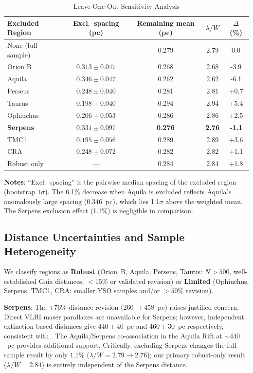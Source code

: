 \documentclass[twoside,twocolumn]{mnras}
\begin{document}
\begin{table}[h]
\caption{Leave-One-Out Sensitivity Analysis}
\label{tab:leave_one_out}
\begin{tabular}{lcccc}
\toprule
Excluded Region & Excl.\ spacing (pc) & Remaining mean (pc) & $\lambda/W$ & $\Delta$ (\%) \\
\midrule
None (full sample) & --- & 0.279 & 2.79 & 0.0 \\
Orion B & $0.313 \pm 0.047$ & 0.268 & 2.68 & -3.9 \\
Aquila & $0.346 \pm 0.047$ & 0.262 & 2.62 & -6.1 \\
Perseus & $0.248 \pm 0.040$ & 0.281 & 2.81 & +0.7 \\
Taurus & $0.198 \pm 0.040$ & 0.294 & 2.94 & +5.4 \\
Ophiuchus & $0.206 \pm 0.053$ & 0.286 & 2.86 & +2.5 \\
\textbf{Serpens} & $0.331 \pm 0.097$ & \textbf{0.276} & \textbf{2.76} & \textbf{-1.1} \\
TMC1 & $0.195 \pm 0.056$ & 0.289 & 2.89 & +3.6 \\
CRA & $0.248 \pm 0.072$ & 0.282 & 2.82 & +1.1 \\
\midrule
Robust only & --- & 0.284 & 2.84 & +1.8 \\
\bottomrule
\end{tabular}
\vspace{2pt}
\footnotesize \textbf{Notes}: ``Excl.\ spacing'' is the pairwise median spacing of the
excluded region (bootstrap $1\sigma$). The 6.1\% decrease when Aquila is excluded
reflects Aquila's anomalously large spacing ($0.346$~pc), which lies 1.1$\sigma$ above
the weighted mean. The Serpens exclusion effect (1.1\%) is negligible in comparison.
\end{table}

\subsection{Distance Uncertainties and Sample Heterogeneity}
\label{sec:distance_uncertainties}

We classify regions as \textbf{Robust} (Orion~B, Aquila, Perseus, Taurus: $N>500$,
well-established Gaia distances, $<15\%$ or validated revision) or \textbf{Limited}
(Ophiuchus, Serpens, TMC1, CRA: smaller YSO samples and/or $>50\%$ revision).

\textbf{Serpens}: The +76\% distance revision ($260 \to 458$~pc) raises justified
concern. Direct VLBI maser parallaxes are unavailable for Serpens; however, independent
extinction-based distances \citep{Yan2022, Green2024} give $440 \pm 40$~pc and
$460 \pm 30$~pc respectively, consistent with \citealt{Zhang2023}. The Aquila/Serpens
co-association in the Aquila Rift at ${\sim}440$~pc \citep{Zucker2020} provides
additional support. Critically, excluding Serpens changes the full-sample
result by only $1.1\%$ ($\lambda/W = 2.79 \to 2.76$); our primary robust-only
result ($\lambda/W = 2.84$) is entirely independent of the Serpens distance.
\end{document}

